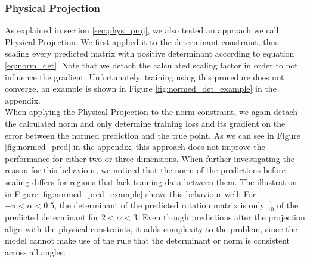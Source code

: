 \subsubsection{Physical Projection}
As explained in section \ref{sec:phys_proj}, we also tested an approach we call Physical Projection. We first applied it to the determinant constraint, thus scaling every predicted matrix with positive determinant according to equation \eqref{eq:norm_det}. Note that we detach the calculated scaling factor in order to not influence the gradient. Unfortunately, training using this procedure does not converge, an example is shown in Figure \ref{fig:normed_det_example} in the appendix.\\
\indent When applying the Physical Projection to the norm constraint, we again detach the calculated norm and only determine training loss and its gradient on the error between the normed prediction and the true point. As we can see in Figure \ref{fig:normed_pred} in the appendix, this approach does not improve the performance for either two or three dimensions. When further investigating the reason for this behaviour, we noticed that the norm of the predictions before scaling differs for regions that lack training data between them. The illustration in Figure \ref{fig:normed_pred_example} shows this behaviour well: For $-\pi < \alpha < 0.5$, the determinant of the predicted rotation matrix is only $\frac{1}{10}$ of the predicted determinant for $2 < \alpha < 3$. Even though predictions after the projection align with the physical constraints, it adds complexity to the problem, since the model cannot make use of the rule that the determinant or norm is consistent across all angles.







\clearpage


